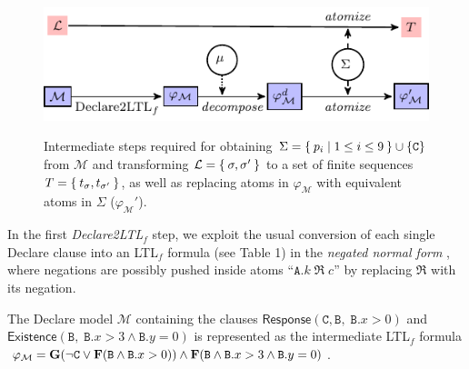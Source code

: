 \begin{figure}[!t]
	\centering
	{\includegraphics[width=.7\textwidth]{images/example_3}}
	\caption{Intermediate steps required for obtaining $\Sigma=\Set{p_i|1\leq i\leq 9}\cup\{\texttt{C}\}$ from $\mathcal{M}$ and transforming $\mathcal{L}=\Set{\sigma,\sigma'}$ to a set of finite sequences $T=\Set{t_\sigma,t_{\sigma'}}$, as well as replacing atoms in $\varphi_{\mathcal{M}}$ with equivalent atoms in $\Sigma$ ($\varphi_{\mathcal{M}}'$).}\label{fig:twoexamples}
\end{figure}

In the first \emph{Declare2LTL}$_f$ step, we exploit the usual conversion of each single Declare clause into an LTL$_f$ formula (see Table 1) in the \textit{negated normal form} \cite{LiPZVR20}, where negations are possibly pushed inside atoms ``$\texttt{A}.k\;\Re\; c$'' by replacing $\Re$ with its negation.
\begin{ex} \label{ex:first}
The Declare model $\mathcal{M}$ containing the  clauses $\mathsf{Response}(\texttt{C},\texttt{B},\;\texttt{B}.x>0)$ and
$\mathsf{Existence}(\texttt{B},\; \texttt{B}.x>3\wedge \texttt{B}.y=0)$ is represented as the intermediate LTL$_f$ formula $\varphi_{\mathcal{M}}=\mathbf{G}(\neg\texttt{C}\vee \mathbf{F}(\texttt{B}\wedge \texttt{B}.x>0))\wedge \mathbf{F}(\texttt{B}\wedge \texttt{B}.x>3\wedge \texttt{B}.y=0)$.
\end{ex}




